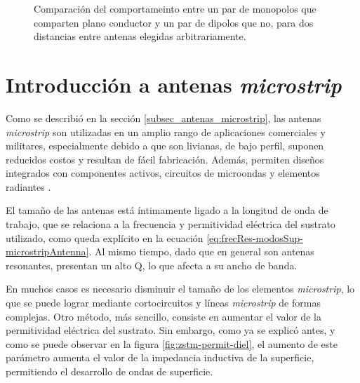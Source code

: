 \begin{figure}[h]
	\centering 
	\hspace{0pt}
	\caption{Comparación del comportameinto entre un par de monopolos que comparten plano conductor y un par de dipolos que no, para dos distancias entre antenas elegidas arbitrariamente.}
	\label{fig:comparacion-monopolos-s-sinGND}
\end{figure} 

	
\section{Introducción a antenas \textit{microstrip}}

Como se describió en la sección \ref{subsec_antenas_microstrip}, las antenas \textit{microstrip} son utilizadas en un amplio rango de aplicaciones comerciales y militares, especialmente debido a que son livianas, de bajo perfil, suponen reducidos costos y resultan de fácil fabricación. Además, permiten diseños integrados con componentes activos, circuitos de microondas y elementos radiantes \cite{Yang:EBGAntennas}.

El tamaño de las antenas está íntimamente ligado a la longitud de onda de trabajo, que se relaciona a la frecuencia y permitividad eléctrica del sustrato utilizado, como queda explícito en la ecuación \ref{eq:frecRes-modosSup-microstripAntenna}. Al mismo tiempo, dado que en general son antenas resonantes, presentan un alto Q, lo que afecta a su ancho de banda.

En muchos casos es necesario disminuir el tamaño de los elementos \textit{microstrip}, lo que se puede lograr mediante cortocircuitos y líneas \textit{microstrip} de formas complejas. Otro método, más sencillo, consiste en aumentar el valor de la permitividad eléctrica del sustrato. Sin embargo, como ya se explicó antes, y como se puede observar en la figura \ref{fig:zstm-permit-diel}, el aumento de este parámetro aumenta el valor de la impedancia inductiva de la superficie, permitiendo el desarrollo de ondas de superficie.

